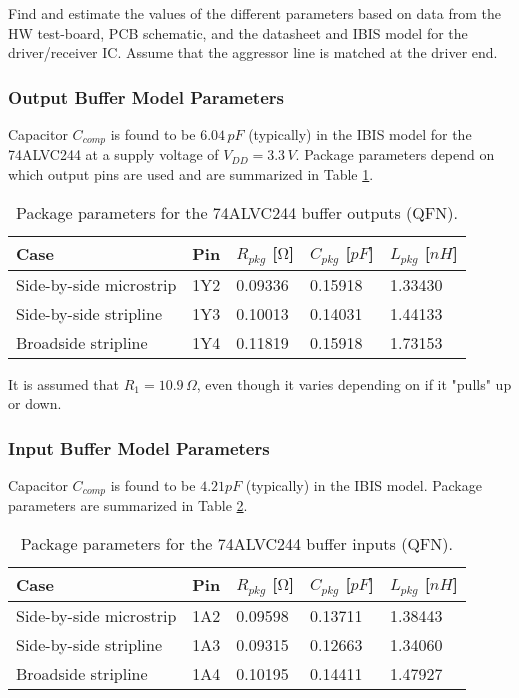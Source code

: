 \documentclass[../main.tex]{subfiles}
\begin{document}
Find and estimate the values of the different parameters based on data from the HW test-board, PCB schematic, and the datasheet and IBIS model for the driver/receiver IC. Assume that the aggressor line is matched at the driver end.

\solution

\subsubsection{Output Buffer Model Parameters}

Capacitor $C_{comp}$ is found to be $6.04\,\si{pF}$ (typically) in the IBIS model for the 74ALVC244 at a supply voltage of $V_{DD} = 3.3\,\si{V}$. Package parameters depend on which output pins are used and are summarized in Table \ref{tab:pkg-params}.

\begin{table}[h]
    \centering
    \begin{tabular}{l|l l l l}
        \toprule[1pt]
        \textbf{Case} & \textbf{Pin} & $R_{pkg}$ [$\si{\ohm}$] & $C_{pkg}$ [$\si{pF}$] & $L_{pkg}$ [$\si{nH}$] \\
        \midrule
        Side-by-side microstrip & 1Y2 & 0.09336 & 0.15918 & 1.33430 \\
        Side-by-side stripline  & 1Y3 & 0.10013 & 0.14031 & 1.44133 \\
        Broadside stripline     & 1Y4 & 0.11819 & 0.15918 & 1.73153 \\
        \bottomrule[1pt]
    \end{tabular}
    \caption{Package parameters for the 74ALVC244 buffer outputs (QFN).}
    \label{tab:pkg-params}
\end{table}

It is assumed that $R_1 = 10.9\,\si{\Omega}$, even though it varies depending on if it "pulls" up or down.

\subsubsection{Input Buffer Model Parameters}

Capacitor $C_{comp}$ is found to be $4.21\si{pF}$ (typically) in the IBIS model. Package parameters are summarized in Table \ref{tab:pkg-params2}.

\begin{table}[h]
    \centering
    \begin{tabular}{l|l l l l}
        \toprule[1pt]
        \textbf{Case} & \textbf{Pin} & $R_{pkg}$ [$\si{\ohm}$] & $C_{pkg}$ [$\si{pF}$] & $L_{pkg}$ [$\si{nH}$] \\
        \midrule
        Side-by-side microstrip & 1A2 & 0.09598 & 0.13711 & 1.38443 \\
        Side-by-side stripline  & 1A3 & 0.09315 & 0.12663 & 1.34060 \\
        Broadside stripline     & 1A4 & 0.10195 & 0.14411 & 1.47927 \\
        \bottomrule[1pt]
    \end{tabular}
    \caption{Package parameters for the 74ALVC244 buffer inputs (QFN).}
    \label{tab:pkg-params2}
\end{table}
\end{document}
